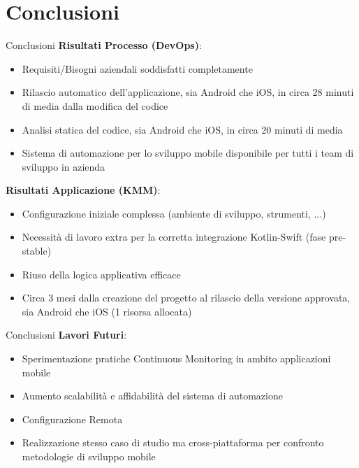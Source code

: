 
\section{Conclusioni}

\begin{frame}{Conclusioni}
    \textbf{Risultati Processo (DevOps)}:
    \begin{itemize}
        \item Requisiti/Bisogni aziendali soddisfatti completamente
        \item Rilascio automatico dell'applicazione, sia Android che iOS, in circa 28 minuti di media dalla modifica del codice
        \item Analisi statica del codice, sia Android che iOS, in circa 20 minuti di media
        \item Sistema di automazione per lo sviluppo mobile disponibile per tutti i team di sviluppo in azienda
    \end{itemize}
    \vspace{2mm}
    \textbf{Risultati Applicazione (KMM)}:
    \begin{itemize}
        \item Configurazione iniziale complessa (ambiente di sviluppo, strumenti, ...)
        \item Necessità di lavoro extra per la corretta integrazione Kotlin-Swift (fase pre-stable)
        \item Riuso della logica applicativa efficace
        \item Circa 3 mesi dalla creazione del progetto al rilascio della versione approvata, sia Android che iOS (1 risorsa allocata)
    \end{itemize}
\end{frame}

\begin{frame}{Conclusioni}
    \textbf{Lavori Futuri}:
    \begin{itemize}
        \item Sperimentazione pratiche Continuous Monitoring in ambito applicazioni mobile
        \item Aumento scalabilità e affidabilità del sistema di automazione
        \item Configurazione Remota
        \item Realizzazione stesso caso di studio ma cross-piattaforma per confronto metodologie di sviluppo mobile
    \end{itemize}
\end{frame}